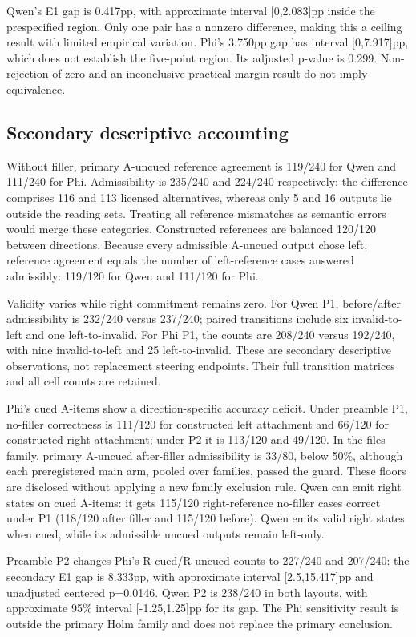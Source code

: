 \documentclass[11pt]{article}
\begin{document}
Qwen's E1 gap is 0.417pp, with approximate interval [0,2.083]pp inside the prespecified region. Only one pair has a nonzero difference, making this a ceiling result with limited empirical variation. Phi's 3.750pp gap has interval [0,7.917]pp, which does not establish the five-point region. Its adjusted p-value is 0.299. Non-rejection of zero and an inconclusive practical-margin result do not imply equivalence.

\subsection{Secondary descriptive accounting}
Without filler, primary A-uncued reference agreement is 119/240 for Qwen and 111/240 for Phi. Admissibility is 235/240 and 224/240 respectively: the difference comprises 116 and 113 licensed alternatives, whereas only 5 and 16 outputs lie outside the reading sets. Treating all reference mismatches as semantic errors would merge these categories. Constructed references are balanced 120/120 between directions. Because every admissible A-uncued output chose left, reference agreement equals the number of left-reference cases answered admissibly: 119/120 for Qwen and 111/120 for Phi.

Validity varies while right commitment remains zero. For Qwen P1, before/after admissibility is 232/240 versus 237/240; paired transitions include six invalid-to-left and one left-to-invalid. For Phi P1, the counts are 208/240 versus 192/240, with nine invalid-to-left and 25 left-to-invalid. These are secondary descriptive observations, not replacement steering endpoints. Their full transition matrices and all cell counts are retained.

Phi's cued A-items show a direction-specific accuracy deficit. Under preamble P1, no-filler correctness is 111/120 for constructed left attachment and 66/120 for constructed right attachment; under P2 it is 113/120 and 49/120. In the files family, primary A-uncued after-filler admissibility is 33/80, below 50\%, although each preregistered main arm, pooled over families, passed the guard. These floors are disclosed without applying a new family exclusion rule. Qwen can emit right states on cued A-items: it gets 115/120 right-reference no-filler cases correct under P1 (118/120 after filler and 115/120 before). Qwen emits valid right states when cued, while its admissible uncued outputs remain left-only.

Preamble P2 changes Phi's R-cued/R-uncued counts to 227/240 and 207/240: the secondary E1 gap is 8.333pp, with approximate interval [2.5,15.417]pp and unadjusted centered p=0.0146. Qwen P2 is 238/240 in both layouts, with approximate 95\% interval [-1.25,1.25]pp for its gap. The Phi sensitivity result is outside the primary Holm family and does not replace the primary conclusion.
\end{document}
